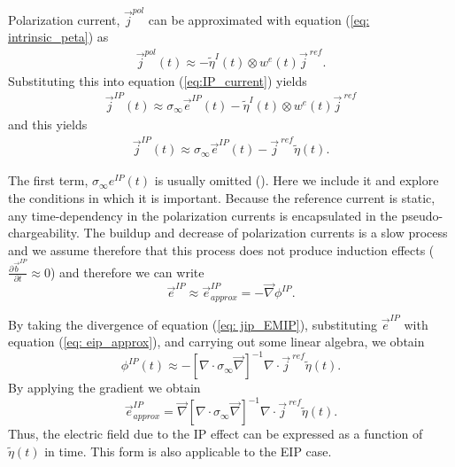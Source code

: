 \documentclass[a4paper, 11pt]{article}
\renewcommand{\div}{\nabla\cdot}
\newcommand{\grad}{\vec \nabla}
\newcommand{\siginf}{\sigma_\infty}
\renewcommand {\j}  { {\vec j} }
\renewcommand {\b}  { {\vec b} }
\newcommand {\e}  { {\vec e} }
\newcommand{\peta}{\tilde{\eta}}
\newcommand{\jref}{\j^{\ ref}}
\begin{document}
Polarization current, $\j^{pol}$ can be approximated with equation (\ref{eq: intrinsic_peta}) as
\begin{eqnarray}
  \j^{pol}(t) \approx - \peta^{I}(t)\otimes w^e(t)\jref.
\end{eqnarray}
Substituting this into equation (\ref{eq:IP_current}) yields
\begin{eqnarray}
  \j^{IP}(t) \approx \siginf\e^{IP}(t) - \peta^{I}(t)\otimes w^e(t)\jref
\end{eqnarray}
and this yields
\begin{eqnarray}
  \j^{IP}(t) \approx \siginf\e^{IP}(t) -\jref\peta(t).
  \label{eq: jip_EMIP}
\end{eqnarray}

The first term, $\siginf e^{IP}(t)$ is usually omitted (\cite{Smith1988a}). Here we include it and explore the conditions in which it is important. 
Because the reference current is static, any time-dependency in the polarization currents is encapsulated in the pseudo-chargeability. The buildup and decrease of polarization currents is a slow process and we assume therefore that this process does not produce induction effects ($\frac{\partial \b^{IP}}{\partial t} \approx 0$) and therefore we can write 
\begin{equation}
  \e^{IP} \approx  \e^{IP}_{approx} = -\grad\phi^{IP}.
  \label{eq: eip_approx}
\end{equation}

By taking the divergence of  equation (\ref{eq: jip_EMIP}), substituting  $\e^{IP}$ with equation (\ref{eq: eip_approx}), and carrying out some linear algebra, we obtain
\begin{equation}
  \phi^{IP}(t) \approx -[\div \siginf\grad]^{-1}\div\jref\peta(t).
  \label{eq: phiIPapprox_general}
\end{equation}
By applying the gradient we obtain 
\begin{equation}
    \e^{IP}_{approx} = \grad[\div \siginf\grad]^{-1}\div\jref\peta(t).
    \label{eq: eip_approx_full}
\end{equation}
Thus, the electric field due to the IP effect can be expressed as a function of $\peta(t)$ in time. 
This form is also applicable to the  EIP case.   
\end{document}
